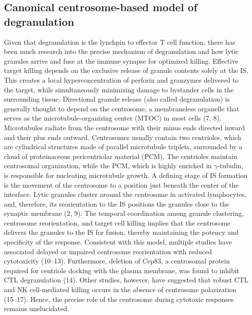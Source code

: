 \subsection{Canonical centrosome-based model of degranulation}
Given that degranulation is the lynchpin to effector T cell function, there has been much research into the precise mechanism of degranulation and how lytic granules arrive and fuse at the immune synapse for optimized killing. Effective target killing depends on the exclusive release of granule contents solely at the IS. This creates a local hyperconcentration of perforin and granzymes delivered to the target, while simultaneously minimizing damage to bystander cells in the surrounding tissue.  Directional granule release (also called degranulation) is generally thought to depend on the centrosome,  a membraneless organelle that serves as the microtubule-organizing center (MTOC) in most cells (7, 8).  Microtubules radiate from the centrosome with their minus ends directed inward and their plus ends outward.  Centrosomes usually contain two centrioles,  which are cylindrical structures made of parallel microtubule triplets,  surrounded by a cloud of proteinaceous pericentriolar material (PCM).  The centrioles maintain centrosomal organization,  while the PCM,  which is highly enriched in $\gamma$-tubulin,  is responsible for nucleating microtubule growth.  A defining stage of IS formation is the movement of the centrosome to a position just beneath the center of the interface.  Lytic granules cluster around the centrosome in activated lymphocytes,  and,  therefore,  its reorientation to the IS positions the granules close to the synaptic membrane (2, 9). The temporal coordination among granule clustering,  centrosome reorientation,  and target cell killing implies that the centrosome delivers the granules to the IS for fusion,  thereby maintaining the potency and specificity of the response.  Consistent with this model,  multiple studies have associated delayed or impaired centrosome reorientation with reduced cytotoxicity (10–13). Furthermore, deletion of Cep83, a centrosomal protein required for centriole docking with the plasma membrane,  was found to inhibit CTL degranulation (14). Other studies,  however,  have suggested that robust CTL and NK cell-mediated killing occurs in the absence of centrosome polarization (15–17).  Hence,  the precise role of the centrosome during cytotoxic responses remains unelucidated.


